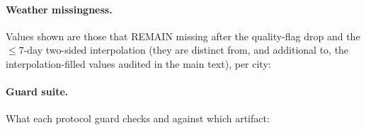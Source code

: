 \paragraph{Weather missingness.} Values shown are those that REMAIN
missing after the quality-flag drop and the $\le 7$-day two-sided
interpolation (they are distinct from, and additional to, the
interpolation-filled values audited in the main text), per city:

{\footnotesize}

\paragraph{Guard suite.} What each protocol guard checks and against which
artifact:

\noindent\resizebox{\linewidth}{!}{}
